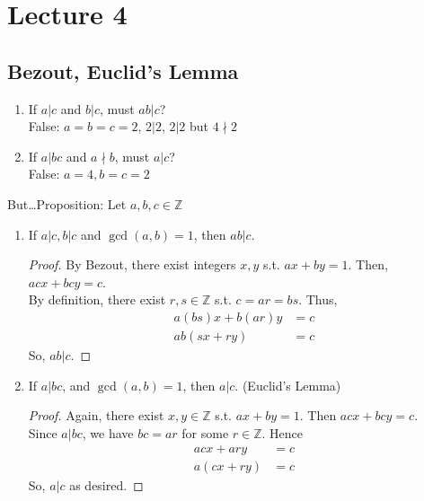 \chapter{Lecture 4}
\date{September 5, 2024}

\section{Bezout, Euclid's Lemma}
    \begin{enumerate}
        \item If $a|c$ and $b|c$, must $ab|c$? \\
        False: $a=b=c=2$, $2|2$, $2|2$ but $4\nmid 2$ 
        \item If $a|bc$ and $a\nmid b$, must $a|c$? \\
        False: $a=4, b=c=2$
    \end{enumerate}
    
    But\dots Proposition: Let $a,b,c\in\mathbb{Z}$
    \begin{enumerate}
        \item If $a|c, b|c$ and $\gcd(a,b)=1$, then $ab|c$.
        \begin{proof}
            By Bezout, there exist integers $x,y$ s.t. $ax+by=1$. 
            Then, $acx+bcy = c$. \\
            By definition, there exist $r,s\in\mathbb{Z}$ s.t. $c=ar=bs$. 
            Thus, 
            \begin{align*}
                a(bs)x + b(ar)y &= c \\
                ab(sx+ry) &= c
            \end{align*}
            So, $ab|c$.
        \end{proof}

        \item If $a|bc$, and $\gcd(a,b)=1$, then $a|c$. (Euclid's Lemma)
        \begin{proof}
            Again, there exist $x,y\in\mathbb{Z}$ s.t. $ax+by=1$.
            Then $acx+bcy=c$. \\
            Since $a|bc$, we have $bc=ar$ for some $r\in\mathbb{Z}$.
            Hence 
            \begin{align*}
                acx+ary &= c \\
                a(cx+ry) &= c
            \end{align*}
            So, $a|c$ as desired.
        \end{proof}
        
    \end{enumerate}

